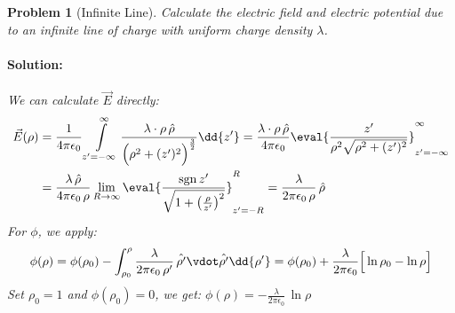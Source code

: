 \documentclass[12pt]{article}
\DeclareMathOperator{\sgn}{sgn}
\newcommand*{\vE}{\vec{E}}
\newcommand*{\ee}{\epsilon_0}
\newtheorem{problem}[theorem]{Problem}
\newenvironment{solution}{\paragraph{Solution:}}{\hfill}
\begin{document}
\begin{problem}[Infinite Line]
  Calculate the electric field and electric potential due to an infinite line of charge with uniform charge density $\lambda$.
  \begin{solution}
    We can calculate $\vE$ directly:
    \begin{align*}
      \vE(\rho)&=\frac{1}{4\pi\ee}\int\limits_{z'=-\infty}^\infty\frac{\lambda\cdot\rho\,\hat{\rho}}{\Big(\rho^2+(z')^2\Big)^{\frac{3}{2}}}\dd{z'}=\frac{\lambda\cdot\rho\,\hat{\rho}}{4\pi\ee}\eval{\frac{z'}{\rho^2\sqrt{\rho^2+(z')^2}}}_{z'=-\infty}^\infty\\
      &=\frac{\lambda\,\hat{\rho}}{4\pi\ee\,\rho}\lim_{R\to\infty}\eval{\frac{\sgn{z'}}{\sqrt{1+\left(\frac{\rho}{z'}\right)^2}}}_{z'=-R}^R=\frac{\lambda}{2\pi\ee\,\rho}\,\hat{\rho}
    \end{align*}
    For $\phi$, we apply:
    $$\phi(\rho)=\phi(\rho_0)-\int_{\rho_0}^\rho \frac{\lambda}{2\pi\ee\,\rho'}\,\hat{\rho'}\vdot\hat{\rho'}\dd{\rho'}=\phi(\rho_0)+\frac{\lambda}{2\pi\ee}\Big[\ln{\rho_0}-\ln{\rho}\Big]$$
    Set $\rho_0=1$ and $\phi(\rho_0)=0$, we get: $\displaystyle\phi(\rho)=-\frac{\lambda}{2\pi\ee}\,\ln{\rho}$
  \end{solution}
\end{problem}
\end{document}
